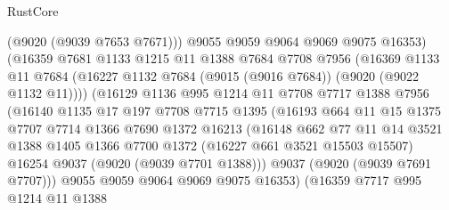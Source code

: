 \begin{lexlean}{RustCore}
\begin{coremodule}
                        (@9020 (@9039 @7653 @7671)))
                      @9055
                      @9059
                      @9064
                      @9069
                      @9075
                      @16353)
                    (@16359
                      @7681
                      @1133
                      @1215
                      @11
                      @1388
                      @7684
                      @7708
                      @7956
                      (@16369
                        @1133
                        @11
                        @7684
                        (@16227 @1132 @7684 (@9015 (@9016 @7684)) (@9020 (@9022 @1132 @11))))
                      (@16129
                        @1136
                        @995
                        @1214
                        @11
                        @7708
                        @7717
                        @1388
                        @7956
                        (@16140
                          @1135
                          @17
                          @197
                          @7708
                          @7715
                          @1395
                          (@16193
                            @664
                            @11
                            @15
                            @1375
                            @7707
                            @7714
                            @1366
                            @7690
                            @1372
                            @16213
                            (@16148
                              @662
                              @77
                              @11
                              @14
                              @3521
                              @1388
                              @1405
                              @1366
                              @7700
                              @1372
                              (@16227 @661 @3521 @15503 @15507)
                              @16254
                              @9037
                              (@9020 (@9039 @7701 @1388)))
                            @9037
                            (@9020 (@9039 @7691 @7707)))
                          @9055
                          @9059
                          @9064
                          @9069
                          @9075
                          @16353)
                        (@16359
                          @7717
                          @995
                          @1214
                          @11
                          @1388

\end{coremodule}
\end{lexlean}
